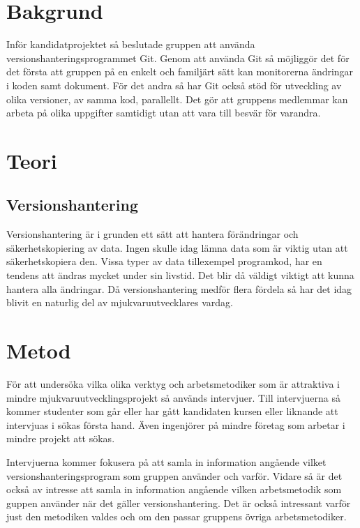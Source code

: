 \vspace{1.5em}
\section{Bakgrund}
Inför kandidatprojektet så beslutade gruppen att använda versionshanteringsprogrammet Git. Genom att använda Git så möjliggör det för det första att gruppen på en enkelt och familjärt sätt kan monitorerna ändringar i koden samt dokument. För det andra så har Git också stöd för utveckling av olika versioner, av samma kod, parallellt. Det gör att gruppens medlemmar kan arbeta på olika uppgifter samtidigt utan att vara till besvär för varandra.

\vspace{1.5em}
\section{Teori}
  \subsection{Versionshantering}

Versionshantering är i grunden ett sätt att hantera förändringar och säkerhetskopiering av data. Ingen skulle idag lämna data som är viktig utan att säkerhetskopiera den. Vissa typer av data tillexempel programkod, har en tendens att ändras mycket under sin livstid. Det blir då väldigt viktigt att kunna hantera alla ändringar. Då versionshantering medför flera fördela så har det idag blivit en naturlig del av mjukvaruutvecklares vardag. \cite{VersionControlGit}

\vspace{1.5em}
\section{Metod}
För att undersöka vilka olika verktyg och arbetsmetodiker som är attraktiva i mindre mjukvaruutvecklingsprojekt så används intervjuer. Till intervjuerna så kommer studenter som går eller har gått kandidaten kursen eller liknande att intervjuas i sökas första hand. Även ingenjörer på mindre företag som arbetar i mindre projekt att sökas.


Intervjuerna kommer fokusera på att samla in information angående vilket versionshanteringsprogram som gruppen använder och varför. Vidare så är det också av intresse att samla in information angående vilken arbetsmetodik som guppen använder när det gäller versionshantering. Det är också intressant varför just den metodiken valdes och om den passar gruppens övriga arbetsmetodiker.


